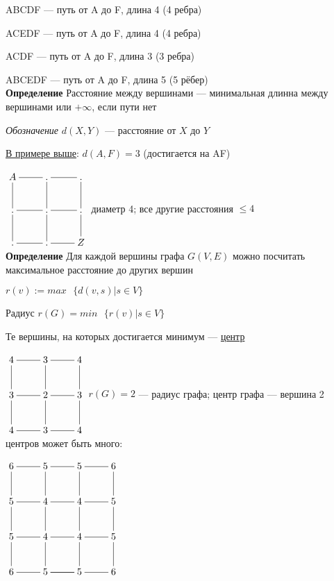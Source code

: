 \documentclass[a4paper, 12pt] {article}
\begin{document}
ABCDF --- путь от A до F, длина 4 (4 ребра)

ACEDF --- путь от A до F, длина 4 (4 ребра)

ACDF --- путь от A до F, длина 3 (3 ребра)

ABCEDF --- путь от A до F, длина 5 (5 рёбер)\\

\textbf{Определение} Расстояние между вершинами --- минимальная длинна между вершинами или $ + \infty $, если пути нет

\textit{Обозначение} $ d(X, Y) $ --- расстояние от $ X $ до $ Y $

\underline{В примере выше}: $ d(A, F) =3$ (достигается на AF)

$ \begin{matrix}
	\xymatrix{
	A \ar@{-}[r] \ar@{-}[d] & . \ar@{-}[r] \ar@{-}[d] & . \ar@{-}[d]  \\
	. \ar@{-}[r] \ar@{-}[d] & . \ar@{-}[r] \ar@{-}[d] & . \ar@{-}[d] \\
	. \ar@{-}[r] & . \ar@{-}[r] & Z \\
	}
\end{matrix} $ диаметр 4; все другие расстояния $ \le 4 $\\

\textbf{Определение} Для каждой вершины графа $ G(V, E) $ можно посчитать максимальное расстояние до других вершин

$ r(v):=max \text{ } \{d(v,s) | s \in V \}$

Радиус $ r(G)=min \text{ } \{r(v) | s \in V \} $

Те вершины, на которых достигается минимум --- \underline{центр}

$ \begin{matrix}
	\xymatrix{
		4 \ar@{-}[r] \ar@{-}[d] & 3 \ar@{-}[r] \ar@{-}[d] & 4 \ar@{-}[d]  \\
		3 \ar@{-}[r] \ar@{-}[d] & 2 \ar@{-}[r] \ar@{-}[d] & 3 \ar@{-}[d] \\
		4 \ar@{-}[r] & 3 \ar@{-}[r] & 4 \\
	}
\end{matrix} $ $ r(G) =2 $ --- радиус графа; центр графа --- вершина 2\\

центров может быть много:

$ \begin{matrix}
	\xymatrix{
		6 \ar@{-}[r] \ar@{-}[d] & 5 \ar@{-}[r] \ar@{-}[d] & 5 \ar@{-}[d] \ar@{-}[r] & 6 \ar@{-}[d]\\
		5 \ar@{-}[r] \ar@{-}[d] & 4 \ar@{-}[r] \ar@{-}[d] & 4 \ar@{-}[d] \ar@{-}[r] & 5 \ar@{-}[d]\\
		5 \ar@{-}[r] \ar@{-}[d] & 4 \ar@{-}[r] \ar@{-}[d] & 4 \ar@{-}[d] \ar@{-}[r] & 5 \ar@{-}[d]\\
		6 \ar@{-}[r] & 5 \ar@{-}[r] \ar@{-}[r]& 5 \ar@{-}[r] & 6 \\
	}
\end{matrix} $ 
\end{document}
